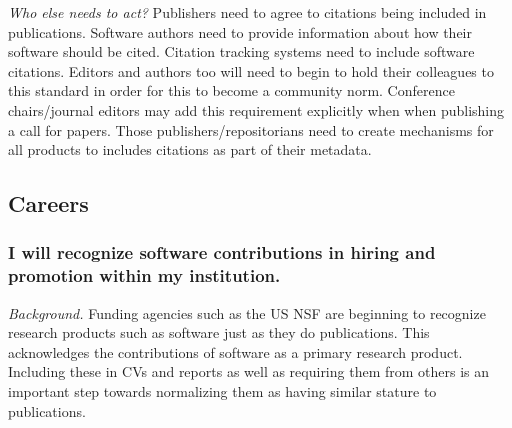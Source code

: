 \documentclass[a4paper,UKenglish]{dagman}
\renewcommand{\paragraph}[1]{\subsubsection*{#1}\xspace}
\newcommand{\etc}{\emph{etc.}\xspace}
\begin{document}
\emph{Who else needs to act?} Publishers need to agree to citations being included in publications. Software authors need to provide information about how their software should be cited. Citation tracking systems need to include software citations. 
Editors and authors too will need to begin to hold their colleagues to this standard in order for this to become a community norm.
Conference chairs/journal editors may add this requirement explicitly when when publishing a call for papers. Those publishers/repositorians  need to create mechanisms for all products to includes citations as part of their metadata.





\subsection*{Careers}

\paragraph{I will recognize software contributions in hiring and promotion within my institution.}

\emph{Background.}
Funding agencies such as the US NSF are beginning to recognize research products such as software just as they do publications. This acknowledges the contributions of software as a primary research product. Including these in CVs and reports as well as requiring them from others is an important step towards normalizing them as having similar stature to publications. 
\end{document}
